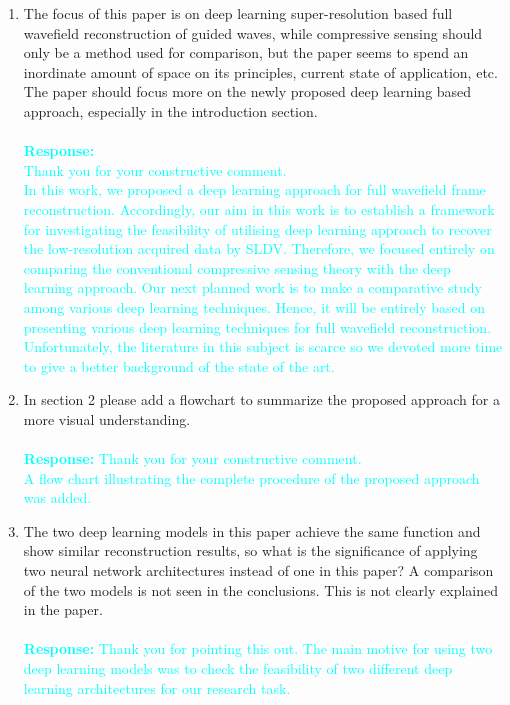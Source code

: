 \documentclass[11pt,a2paper]{report}
\begin{document}
	\begin{enumerate}
		\item The focus of this paper is on deep learning super-resolution based full wavefield reconstruction of guided waves, while compressive sensing should only be a method used for comparison, but the paper seems to spend an inordinate amount of space on its principles, current state of application, etc. 
		The paper should focus more on the newly proposed deep learning based approach, especially in the introduction section.
		\\ \\ 
		\textcolor{Cyan}
		{
			\textbf{Response:}\\
			Thank you for your constructive comment. \\
			In this work, we proposed a deep learning approach for full wavefield frame reconstruction.
			Accordingly, our aim in this work is to establish a framework for investigating the feasibility of utilising deep learning approach to recover the low-resolution acquired data by SLDV.			
			Therefore, we focused entirely on comparing the conventional compressive sensing theory with the deep learning approach.
			Our next planned work is to make a comparative study among various deep learning techniques.
			Hence, it will be entirely based on presenting various deep learning techniques for full wavefield reconstruction.
			Unfortunately, the literature in this subject is scarce so we devoted more time to give a better background of the state of the art.
		}
		\item  In section 2 please add a flowchart to summarize the proposed approach for a more visual understanding.
		\\ \\ 
		\textcolor{Cyan}
		{
			\textbf{Response:}
			Thank you for your constructive comment. \\
			A flow chart illustrating the complete procedure of the proposed approach was added.
		}
		\item The two deep learning models in this paper achieve the same function and show similar reconstruction results, so what is the significance of applying two neural network architectures instead of one in this paper? A comparison of the two models is not seen in the conclusions. 
		This is not clearly explained in the paper. 
		\\ \\ 
		\textcolor{Cyan}
		{
			\textbf{Response:}
			Thank you for pointing this out. 
			The main motive for using two deep learning models was to check the feasibility of two different deep learning architectures for our research task. 
}
\end{enumerate}
\end{document}
